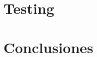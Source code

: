 \documentclass[a4paper, 10pt, twoside]{article}
\begin{document}
\newpage




\section{Testing}
%

\newpage



\section{Conclusiones}
%
\end{document}
